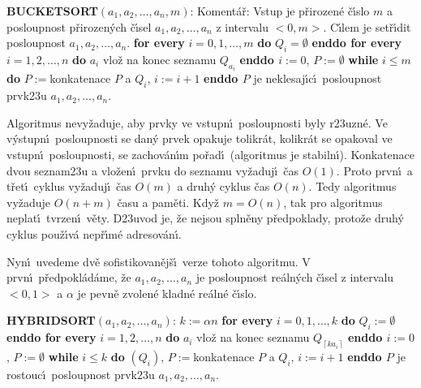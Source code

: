 {\bf BUCKETSORT$\left(a_1,a_2,\dots,a_n,m\right)$}:\newline 
Koment\'a\v r: Vstup je p\v rirozen\'e \v c\'\i slo $m$ a posloupnost 
p\v riroze\-n\'ych \v c\'\i sel $a_1,a_2,\dots,a_n$ z intervalu $
<0,m>$. 
C\'\i lem je set\v r\'\i dit posloupnost $a_1,a_2,\dots,a_n$.\newline 
{\bf for every} $i=0,1,\dots,m$ {\bf do} $Q_i=\emptyset$ {\bf enddo\newline 
for every} $i=1,2,\dots,n$ {\bf do}\newline 
\phantom{---}$a_i$ vlo\v z na konec seznamu $Q_{a_i}$\newline 
{\bf enddo\newline 
$i:=0$}, $P:=\emptyset$\newline
{\bf while} $i\le m$ {\bf do}\newline 
\phantom{---}$P:=$konkatenace $P$ a $Q_i$, $i:=i+1$\newline 
{\bf enddo\newline 
$P$} je neklesaj\'\i c\'\i\ posloupnost prvk\accent23u 
$a_1,a_2,\dots,a_n$.
\medskip

\flushpar Algoritmus nevy\v zaduje, aby prvky ve vstupn\'\i\ 
posloupnosti by\-ly r\accent23uzn\'e.  Ve v\'ystupn\'\i\ posloupnosti se 
dan\'y prvek opakuje tolikr\'at, kolikr\'at se opakoval ve vstupn\'\i\ 
posloupnosti, se zachov\'an\'\i m po\v rad\'\i\ (algoritmus je 
stabiln\'\i ).  Konkatenace dvou 
seznam\accent23u a vlo\v zen\'\i\ prvku do seznamu vy\v zaduj\'\i\ \v cas $
O\left(1\right)$.  
Proto prvn\'\i\ a t\v ret\'\i\ cyklus vy\v zaduj\'\i\ \v cas $O\left(m
\right)$ a druh\'y cyklus 
\v cas $O\left(n\right)$.  Tedy algoritmus vy\v zaduje $O\left(n+m\right)$ \v casu a pam\v eti.  
Kdy\v z $m=O\left(n\right)$, tak pro algoritmus neplat\'\i\ tvrzen\'\i\ v\v ety.  
D\accent23uvod je, \v ze nejsou spln\v eny p\v redpoklady, proto\v ze 
druh\'y cyklus pou\v z\'\i v\'a nep\v r\'\i m\'e adresov\'an\'\i .  
\medskip

\flushpar Nyn\'\i\ uvedeme dv\v e sofistikovan\v ej\v s\'\i\ verze tohoto 
algoritmu. V prvn\'\i\ p\v redpokl\'ad\'ame, \v ze 
$a_1,a_2,\dots,a_n$ je posloupnost re\'aln\'ych 
\v c\'\i sel z intervalu $<0,1>$ a $\alpha$ je pevn\v e zvolen\'e kladn\'e 
re\'aln\'e \v c\'\i slo.
\medskip

{\bf HYBRIDSORT$\left(a_1,a_2,\dots,a_n\right)$}:\newline 
$k:=\alpha n$\newline 
{\bf for every} $i=0,1,\dots,k$ {\bf do} $Q_i:=\emptyset$ {\bf enddo\newline 
for every} $i=1,2,\dots,n$ {\bf do}\newline 
\phantom{---}$a_i$ vlo\v z na konec seznamu $Q_{\left\lceil ka_i\right\rceil}$\newline 
{\bf enddo\newline 
$i:=0$}, $P:=\emptyset$ \newline 
{\bf while} $i\le k$ {\bf do}\newline 
\phantom{---}{\bf HEAPSORT}$\left(Q_i\right)$, 
\phantom{---}$P:=$konkatenace $P$ a $Q_i$, $i:=i+1$\newline 
{\bf enddo\newline 
$P$} je rostouc\'\i\ posloupnost prvk\accent23u 
$a_1,a_2,\dots,a_n$.
\bigskip

